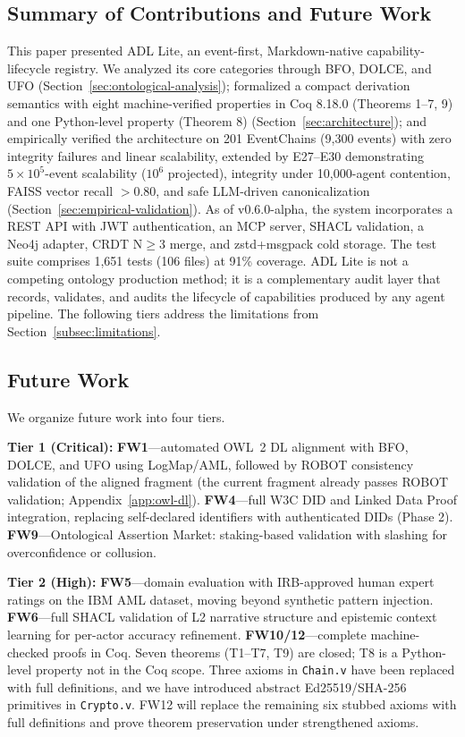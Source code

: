 
\subsection{Summary of Contributions and Future Work}\label{subsec:summary}

This paper presented ADL Lite, an event-first, Markdown-native capability-lifecycle registry. We analyzed its core categories through BFO, DOLCE, and UFO (Section~\ref{sec:ontological-analysis}); formalized a compact derivation semantics with eight machine-verified properties in Coq 8.18.0 (Theorems 1--7, 9) and one Python-level property (Theorem 8) (Section~\ref{sec:architecture}); and empirically verified the architecture on 201 EventChains (9,300 events) with zero integrity failures and linear scalability, extended by E27--E30 demonstrating $5\times10^5$-event scalability ($10^6$ projected), integrity under 10{,}000-agent contention, FAISS vector recall ${>}0.80$, and safe LLM-driven canonicalization (Section~\ref{sec:empirical-validation}). As of v0.6.0-alpha, the system incorporates a REST API with JWT authentication, an MCP server, SHACL validation, a Neo4j adapter, CRDT N$\geq$3 merge, and zstd+msgpack cold storage. The test suite comprises 1,651 tests (106 files) at 91\% coverage. ADL Lite is not a competing ontology production method; it is a complementary audit layer that records, validates, and audits the lifecycle of capabilities produced by any agent pipeline. The following tiers address the limitations from Section~\ref{subsec:limitations}.

\subsection{Future Work}\label{subsec:future-work}

We organize future work into four tiers.

\textbf{Tier 1 (Critical):} \textbf{FW1}---automated OWL~2 DL alignment with BFO, DOLCE, and UFO using LogMap/AML, followed by ROBOT consistency validation of the aligned fragment (the current fragment already passes ROBOT validation; Appendix~\ref{app:owl-dl}). \textbf{FW4}---full W3C DID and Linked Data Proof integration, replacing self-declared identifiers with authenticated DIDs (Phase 2). \textbf{FW9}---Ontological Assertion Market: staking-based validation with slashing for overconfidence or collusion.

\textbf{Tier 2 (High):} \textbf{FW5}---domain evaluation with IRB-approved human expert ratings on the IBM AML dataset, moving beyond synthetic pattern injection. \textbf{FW6}---full SHACL validation of L2 narrative structure and epistemic context learning for per-actor accuracy refinement. \textbf{FW10/12}---complete machine-checked proofs in Coq. Seven theorems (T1--T7, T9) are closed; T8 is a Python-level property not in the Coq scope. Three axioms in \texttt{Chain.v} have been replaced with full definitions, and we have introduced abstract Ed25519/SHA-256 primitives in \texttt{Crypto.v}. FW12 will replace the remaining six stubbed axioms with full definitions and prove theorem preservation under strengthened axioms.

